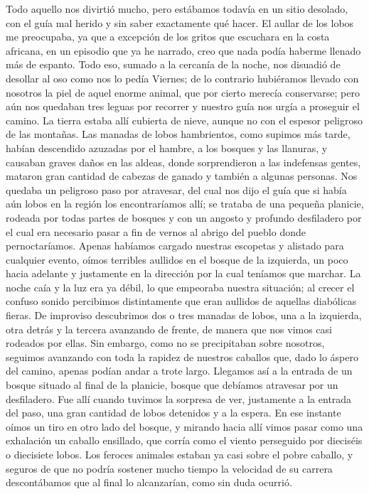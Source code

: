 \documentclass{novela}
\begin{document}
    Todo aquello nos divirtió mucho, pero estábamos todavía en un sitio desolado, con el guía mal herido y sin saber exactamente qué hacer. El aullar de los lobos me preocupaba, ya que a excepción de los gritos que escuchara en la costa africana, en un episodio que ya he narrado, creo que nada podía haberme llenado más de espanto.
    Todo eso, sumado a la cercanía de la noche, nos disuadió de desollar al oso como nos lo pedía Viernes; de lo contrario hubiéramos llevado con nosotros la piel de aquel enorme animal, que por cierto merecía conservarse; pero aún nos quedaban tres leguas por recorrer y nuestro guía nos urgía a proseguir el camino.
    La tierra estaba allí cubierta de nieve, aunque no con el espesor peligroso de las montañas. Las manadas de lobos hambrientos, como supimos más tarde, habían descendido azuzadas por el hambre, a los bosques y las llanuras, y causaban graves daños en las aldeas, donde sorprendieron a las indefensas gentes, mataron gran cantidad de cabezas de ganado y también a algunas personas.
    Nos quedaba un peligroso paso por atravesar, del cual nos dijo el guía que si había aún lobos en la región los encontraríamos allí; se trataba de una pequeña planicie, rodeada por todas partes de bosques y con un angosto y profundo desfiladero por el cual era necesario pasar a fin de vernos al abrigo del pueblo donde pernoctaríamos. Apenas habíamos cargado nuestras escopetas y alistado para cualquier evento, oímos terribles aullidos en el bosque de la izquierda, un poco hacia adelante y justamente en la dirección por la cual teníamos que marchar.
    La noche caía y la luz era ya débil, lo que empeoraba nuestra situación; al crecer el confuso sonido percibimos distintamente que eran aullidos de aquellas diabólicas fieras. De improviso descubrimos dos o tres manadas de lobos, una a la izquierda, otra detrás y la tercera avanzando de frente, de manera que nos vimos casi rodeados por ellas. Sin embargo, como no se precipitaban sobre nosotros, seguimos avanzando con toda la rapidez de nuestros caballos que, dado lo áspero del camino, apenas podían andar a trote largo. Llegamos así a la entrada de un bosque situado al final de la planicie, bosque que debíamos atravesar por un desfiladero. Fue allí cuando tuvimos la sorpresa de ver, justamente a la entrada del paso, una gran cantidad de lobos detenidos y a la espera.
    En ese instante oímos un tiro en otro lado del bosque, y mirando hacia allí vimos pasar como una exhalación un caballo ensillado, que corría como el viento perseguido por dieciséis o diecisiete lobos. Los feroces animales estaban ya casi sobre el pobre caballo, y seguros de que no podría sostener mucho tiempo la velocidad de su carrera descontábamos que al final lo alcanzarían, como sin duda ocurrió.
\end{document}
